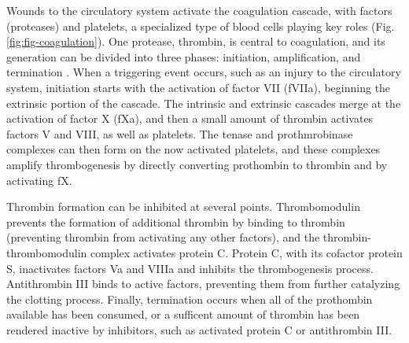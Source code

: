 \documentclass[11pt]{article}
\begin{document}
Wounds to the circulatory system activate the coagulation cascade, with factors (proteases) and platelets, a specialized type of blood cells playing key roles (Fig. \ref{fig:fig-coagulation}). One protease, thrombin, is central to coagulation, and its generation can be divided into three phases: initiation, amplification, and termination \cite{GOLDHABER2006, Brummel:2002aa}. When a triggering event occurs, such as an injury to the circulatory system, initiation starts with the activation of factor VII (fVIIa), beginning the extrinsic portion of the cascade. The intrinsic and extrinsic cascades merge at the activation of factor X (fXa), and then a small amount of thrombin activates factors V and VIII, as well as platelets. The tenase and prothmrobinase complexes can then form on the now activated platelets, and these complexes amplify thrombogenesis by directly converting prothombin to thrombin and by activating fX.



Thrombin formation can be inhibited at several points. Thrombomodulin prevents the formation of additional thrombin by binding to thrombin (preventing thrombin from activating any other factors), and the thrombin-thrombomodulin complex activates protein C. \cite{esmon1989roles} Protein C, with its cofactor protein S, inactivates factors Va and VIIIa and inhibits the thrombogenesis process. \citep{esmon1987anticoagulation} Antithrombin III binds to active factors, preventing them from further catalyzing the clotting process. Finally, termination occurs when all of the prothombin available has been consumed, or a sufficent amount of thrombin has been rendered inactive by inhibitors, such as activated protein C or antithrombin III.
\end{document}
